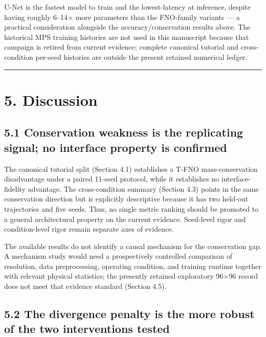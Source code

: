 \documentclass[preprint,12pt]{elsarticle}
\begin{document}
U-Net is the fastest model to train and the lowest-latency at inference,
despite having roughly 6--14\ensuremath{\times} more parameters than the FNO-family
variants --- a practical consideration alongside the
accuracy/conservation results above. The historical MPS training
histories are not used in this manuscript because that campaign is
retired from current evidence; complete canonical tutorial and
cross-condition per-seed histories are outside the present retained
numerical ledger.

\begin{center}\rule{0.5\linewidth}{0.5pt}\end{center}

\section*{5. Discussion}\label{5-discussion}

\subsection*{5.1 Conservation weakness is the replicating signal; no
interface property is
confirmed}\label{51-conservation-weakness-is-the-replicating-signal-no-interface-property-is-confirmed}

The canonical tutorial split (Section 4.1) establishes a T-FNO
mass-conservation disadvantage under a paired 11-seed protocol, while it
establishes no interface-fidelity advantage. The cross-condition summary
(Section 4.3) points in the same conservation direction but is
explicitly descriptive because it has two held-out trajectories and five
seeds. Thus, no single metric ranking should be promoted to a general
architectural property on the current evidence. Seed-level rigor and
condition-level rigor remain separate axes of evidence.

The available results do not identify a causal mechanism for the
conservation gap. A mechanism study would need a prospectively
controlled comparison of resolution, data preprocessing, operating
condition, and training runtime together with relevant physical
statistics; the presently retained exploratory 96\ensuremath{\times}96 record does not
meet that evidence standard (Section 4.5).

\subsection*{5.2 The divergence penalty is the more robust of the two
interventions
tested}\label{52-the-divergence-penalty-is-the-more-robust-of-the-two-interventions-tested}
\end{document}
